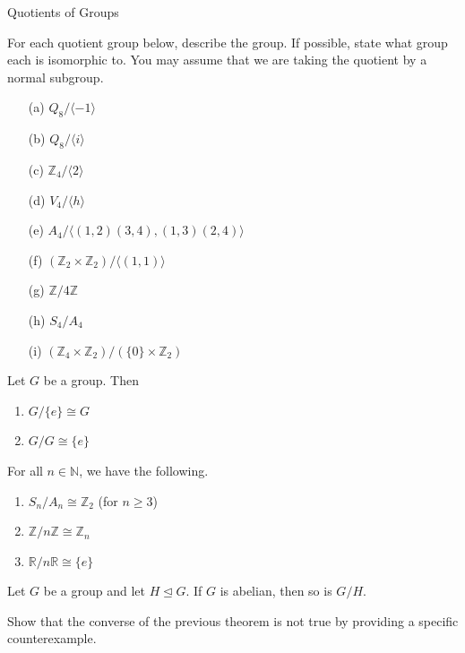 \begin{section}{Quotients of Groups}
\begin{exercise}
For each quotient group below, describe the group.  If possible, state what group each is isomorphic to.  You may assume that we are taking the quotient by a normal subgroup. 
\begin{enumerate}
\item[(a)] $Q_8/\langle -1\rangle$
\item[(b)] $Q_8/\langle i\rangle$
\item[(c)] $\mathbb{Z}_4/\langle 2\rangle$
\item[(d)] $V_4/\langle h\rangle$
\item[(e)] $A_4/\langle (1,2)(3,4),(1,3)(2,4)\rangle$
\item[(f)] $(\mathbb{Z}_2\times \mathbb{Z}_2)/\langle (1,1)\rangle$
\item[(g)] $\mathbb{Z}/4\mathbb{Z}$
\item[(h)] $S_4/A_4$
\item[(i)] $(\mathbb{Z}_4\times \mathbb{Z}_2)/(\{0\}\times \mathbb{Z}_2)$
\end{enumerate}
\end{exercise}

\begin{theorem}
Let $G$ be a group.  Then
\begin{enumerate}
\item $G/\{e\}\cong G$
\item $G/G\cong \{e\}$
\end{enumerate}
\end{theorem}

\begin{theorem}
For all $n\in \mathbb{N}$, we have the following.
\begin{enumerate}
\item $S_n/A_n\cong \mathbb{Z}_2$ (for $n\geq 3$)
\item $\mathbb{Z}/n\mathbb{Z}\cong \mathbb{Z}_n$
\item $\mathbb{R}/n\mathbb{R}\cong \{e\}$
\end{enumerate}
\end{theorem}

\begin{theorem}
Let $G$ be a group and let $H\trianglelefteq G$.  If $G$ is abelian, then so is $G/H$.
\end{theorem}

\begin{problem}
Show that the converse of the previous theorem is not true by providing a specific counterexample.
\end{problem}


\end{section}
